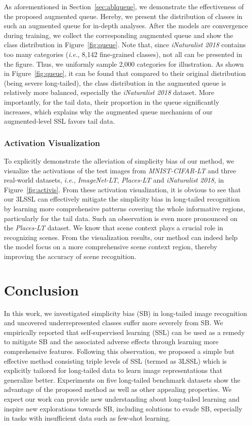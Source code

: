 \documentclass[10pt,journal,compsoc]{IEEEtran}
\newcommand{\ie}{\emph{i.e.}}
\begin{document}
As aforementioned in Section~\ref{sec:ablqueue}, we demonstrate the effectiveness of the proposed augmented queue. Hereby, we present the distribution of classes in such an augmented queue for in-depth analyses. After the models are convergence during training, we collect the corresponding augmented queue and show the class distribution in Figure~\ref{fig:queue}. Note that, since \emph{iNaturalist 2018} contains too many categories (\ie, 8,142 fine-grained classes), not all can be presented in the figure. Thus, we uniformly sample 2,000 categories for illustration. As shown in Figure~\ref{fig:queue}, it can be found that compared to their original distribution (being severe long-tailed), the class distribution in the augmented queue is relatively more balanced, especially the \emph{iNaturalist 2018} dataset. More importantly, for the tail data, their proportion in the queue significantly increases, which explains why the augmented queue mechanism of our augmented-level SSL favors tail data.

\subsubsection{Activation Visualization}\label{sec:activis}

To explicitly demonstrate the alleviation of simplicity bias of our method, we visualize the activations of the test images from \emph{MNIST-CIFAR-LT} and three real-world datasets, \ie, \emph{ImageNet-LT}, \emph{Places-LT} and \emph{iNaturalist 2018}, in Figure~\ref{fig:activis}. From these activation visualization, it is obvious to see that our 3LSSL can effectively mitigate the simplicity bias in long-tailed recognition by learning more comprehensive patterns covering the whole informative regions, particularly for the tail data. Such an observation is even more pronounced on the \emph{Places-LT} dataset. We know that scene context plays a crucial role in recognizing scenes. From the visualization results, our method can indeed help the model focus on a more comprehensive scene context region, thereby improving the accuracy of scene recognition.

\section{Conclusion}\label{sec:conc}

In this work, we investigated simplicity bias (SB) in long-tailed image recognition and uncovered underrepresented classes suffer more severely from SB. We empirically reported that self-supervised learning (SSL) can be used as a remedy to mitigate SB and the associated adverse effects through learning more comprehensive features. Following this observation, we proposed a simple but effective method consisting triple levels of SSL (termed as 3LSSL) which is explicitly tailored for long-tailed data to learn image representations that generalize better. Experiments on five long-tailed benchmark datasets show the advantage of the proposed method as well as other appealing properties. We expect our work can provide new understanding about long-tailed learning and inspire new explorations towards SB, including solutions to evade SB, especially in tasks with insufficient data such as few-shot learning. 
\end{document}
